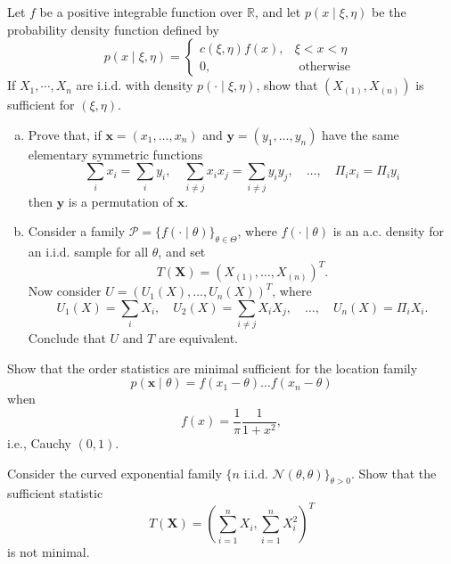 \begin{exercise}
    Let \(f\) be a positive integrable function over \(\mathbb{R}\), and let \(p(x \mid \xi, \eta)\) be the probability density function defined by
    \[
        p(x \mid \xi, \eta)=\left\{\begin{array}{cl}
        c(\xi, \eta) f(x), & \xi<x<\eta \\
        0, & \text { otherwise }
        \end{array}\right.
    \]
    If \(X_{1}, \cdots, X_{n}\) are i.i.d. with density \(p(\cdot \mid \xi, \eta)\), show that \(\left(X_{(1)}, X_{(n)}\right)\) is sufficient for \((\xi, \eta)\).
\end{exercise}

\begin{exercise}
    \begin{enumerate}[(a)]
        \item Prove that, if \(\mathbf{x}=\left(x_{1}, \ldots, x_{n}\right)\) and \(\mathbf{y}=\left(y_{1}, \ldots, y_{n}\right)\) have the same elementary symmetric functions
        \[
            \sum_{i} x_{i}=\sum_{i} y_{i}, \quad \sum_{i \neq j} x_{i} x_{j}=\sum_{i \neq j} y_{i} y_{j}, \quad \ldots, \quad \Pi_{i} x_{i}=\Pi_{i} y_{i}
        \]
        then \(\mathbf{y}\) is a permutation of \(\mathbf{x}\). 
        \item Consider a family \(\mathcal{P}=\{f(\cdot \mid \theta)\}_{\theta \in \Theta}\), where \(f(\cdot \mid \theta)\) is an a.c. density for an i.i.d. sample for all \(\theta\), and set
        \[
            T(\mathbf{X})=\left(X_{(1)}, \ldots, X_{(n)}\right)^T .
        \]
        Now consider \(U=\left(U_{1}(X), \ldots, U_{n}(X)\right)^T\), where
        \[
            U_{1}(X)=\sum_{i} X_{i}, \quad U_{2}(X)=\sum_{i \neq j} X_{i} X_{j}, \quad \ldots, \quad U_{n}(X)=\Pi_{i} X_{i} .
        \]
        Conclude that \(U\) and \(T\) are equivalent. 
    \end{enumerate}
\end{exercise}

\begin{exercise}
    Show that the order statistics are minimal sufficient for the location family
    \[
        p(\mathbf{x} \mid \theta)=f\left(x_{1}-\theta\right) \ldots f\left(x_{n}-\theta\right)
    \]
    when
    \[
        f(x)=\frac{1}{\pi} \frac{1}{1+x^{2}},
    \]
    i.e., Cauchy \((0,1)\). 
\end{exercise}

\begin{exercise}
    Consider the curved exponential family \(\{n \text { i.i.d. } \mathcal{N}(\theta, \theta)\}_{\theta>0}\). Show that the sufficient statistic
    \[
        T(\mathbf{X})=\left(\sum_{i=1}^{n} X_{i}, \sum_{i=1}^{n} X_{i}^{2}\right)^T
    \]
    is not minimal. 
\end{exercise}

